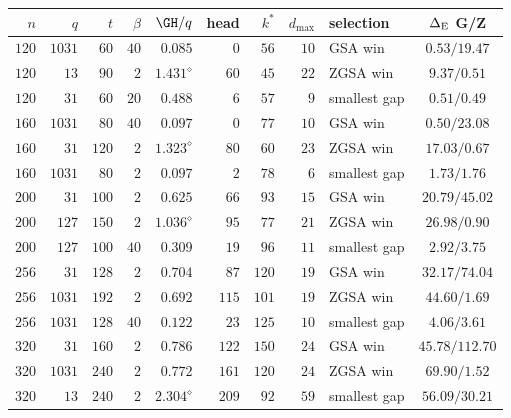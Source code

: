 \begin{tabular}{@{}rrrrrrrrlc@{}}
  \toprule
  $n$ & $q$ & $t$ & $\beta$ & $\GH/q$ & head & $k^*$ & $d_{\max}$ & selection & $\Delta_{\rm E}$ G/Z \\
  \midrule
  $120$ & $1031$ & $60$ & $40$ & $0.085$ & $0$ & $56$ & $10$ & GSA win & $0.53/19.47$ \\
  $120$ & $13$ & $90$ & $2$ & $1.431^{\diamond}$ & $60$ & $45$ & $22$ & ZGSA win & $9.37/0.51$ \\
  $120$ & $31$ & $60$ & $20$ & $0.488$ & $6$ & $57$ & $9$ & smallest gap & $0.51/0.49$ \\
  $160$ & $1031$ & $80$ & $40$ & $0.097$ & $0$ & $77$ & $10$ & GSA win & $0.50/23.08$ \\
  $160$ & $31$ & $120$ & $2$ & $1.323^{\diamond}$ & $80$ & $60$ & $23$ & ZGSA win & $17.03/0.67$ \\
  $160$ & $1031$ & $80$ & $2$ & $0.097$ & $2$ & $78$ & $6$ & smallest gap & $1.73/1.76$ \\
  $200$ & $31$ & $100$ & $2$ & $0.625$ & $66$ & $93$ & $15$ & GSA win & $20.79/45.02$ \\
  $200$ & $127$ & $150$ & $2$ & $1.036^{\diamond}$ & $95$ & $77$ & $21$ & ZGSA win & $26.98/0.90$ \\
  $200$ & $127$ & $100$ & $40$ & $0.309$ & $19$ & $96$ & $11$ & smallest gap & $2.92/3.75$ \\
  $256$ & $31$ & $128$ & $2$ & $0.704$ & $87$ & $120$ & $19$ & GSA win & $32.17/74.04$ \\
  $256$ & $1031$ & $192$ & $2$ & $0.692$ & $115$ & $101$ & $19$ & ZGSA win & $44.60/1.69$ \\
  $256$ & $1031$ & $128$ & $40$ & $0.122$ & $23$ & $125$ & $10$ & smallest gap & $4.06/3.61$ \\
  $320$ & $31$ & $160$ & $2$ & $0.786$ & $122$ & $150$ & $24$ & GSA win & $45.78/112.70$ \\
  $320$ & $1031$ & $240$ & $2$ & $0.772$ & $161$ & $120$ & $24$ & ZGSA win & $69.90/1.52$ \\
  $320$ & $13$ & $240$ & $2$ & $2.304^{\diamond}$ & $209$ & $92$ & $59$ & smallest gap & $56.09/30.21$ \\
  \bottomrule
\end{tabular}
